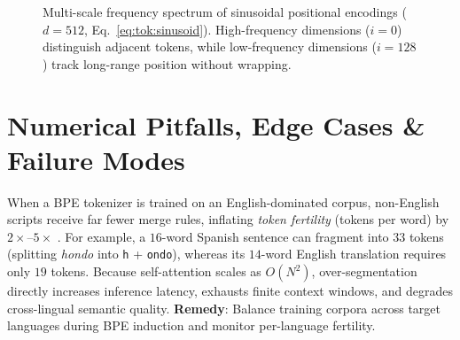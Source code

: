 \documentclass[../../../../master.tex]{subfiles}
\begin{document}
\begin{figure}[htbp]
  \centering
  \caption{Multi-scale frequency spectrum of sinusoidal positional encodings ($d=512$, Eq.~\eqref{eq:tok:sinusoid}). High-frequency dimensions ($i=0$) distinguish adjacent tokens, while low-frequency dimensions ($i=128$) track long-range position without wrapping.}
  \label{fig:tok:sinusoid_spectrum}
\end{figure}

\section{Numerical Pitfalls, Edge Cases \& Failure Modes}
\label{sec:tok:pitfalls}

\begin{pitfall}
When a BPE tokenizer is trained on an English-dominated corpus, non-English scripts receive far fewer merge rules, inflating \emph{token fertility} (tokens per word) by $2\times$--$5\times$ . For example, a $16$-word Spanish sentence can fragment into $33$ tokens (splitting \emph{hondo} into \texttt{h} + \texttt{ondo}), whereas its $14$-word English translation requires only $19$ tokens. Because self-attention scales as $O(N^2)$, over-segmentation directly increases inference latency, exhausts finite context windows, and degrades cross-lingual semantic quality. \textbf{Remedy}: Balance training corpora across target languages during BPE induction and monitor per-language fertility.
\end{pitfall}
\end{document}
